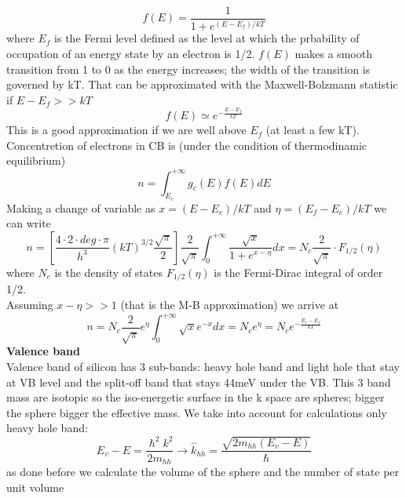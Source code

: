 \begin{equation}
f(E)=\frac{1}{1+e^{(E-E_f)/kT}}
\end{equation}
where $E_f$ is the Fermi level defined as the level at which the prbability of occupation of an energy state by an electron is 1/2. $f(E)$ makes a smooth transition from 1 to 0 as the energy increases; the width of the transition is governed by kT.
That can be approximated with the Maxwell-Bolzmann statistic if $E-E_f>>kT$ 
\begin{equation}
f(E)\simeq e^{-\frac{E-E_f}{kT}}
\end{equation}
This is a good approximation if we are well above $E_f$ (at least a few kT).\\
Concentretion of electrons in CB is (under the condition of thermodinamic equilibrium)
\begin{equation}
n=\int^{+\infty}_{E_c} g_c(E)f(E)dE
\end{equation}
Making a change of variable as $x=(E-E_c)/kT$ and $\eta=(E_f-E_c)/kT$ we can write
\begin{equation}
n=\left[\frac{4\cdot 2\cdot deg \cdot \pi}{h^3}(kT)^{3/2}\frac{\sqrt{\pi}}{2}\right]\frac{2}{\sqrt{\pi}}\int^{+\infty}_0 \frac{\sqrt{x}}{1+e^{x-\eta}}dx=N_c \frac{2}{\sqrt{\pi}}\cdot F_{1/2}(\eta)
\end{equation}  
where $N_c$ is the density of states $F_{1/2}(\eta)$ is the Fermi-Dirac integral of order 1/2.\\
Assuming $x-\eta>>1$ (that is the M-B approximation) we arrive at 
\begin{equation}
n=N_c\frac{2}{\sqrt{\pi}}e^\eta \int^{+\infty}_0\sqrt{x}e^{-x}dx=N_ce^\eta=N_c e^{-\frac{E_c-E_f}{kT}}
\end{equation}
\newline
{\bf Valence band}\\
Valence band of silicon has 3 sub-bands: heavy hole band and light hole that stay at VB level and the split-off band that stays 44meV under the VB. This 3 band mass are isotopic so the iso-energetic surface in the k space are spheres; bigger the sphere bigger the effective mass. We take into account for calculations only heavy hole band: 
\begin{equation}
E_v-E=\frac{\hslash^2 k^2}{2m_{hh}}\rightarrow\hat{k}_{hh}=\frac{\sqrt{2m_{hh}(E_v-E)}}{\hslash}
\end{equation} 
as done before we calculate the volume of the sphere and the number of state per unit volume
